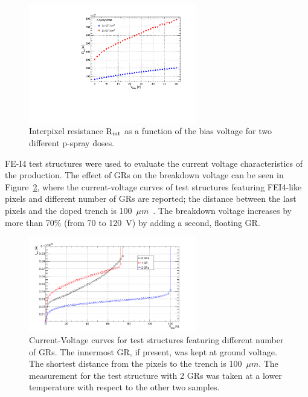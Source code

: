 \begin{figure}[!htbp]
\begin{center}
\includegraphics[width=0.65\textwidth]{edgelessabsCompareRint.pdf}
\caption{\label{fig:Rint}Interpixel resistance $\rm{R_{int}}$ as a function of the bias voltage for two different p-spray doses.}
\end{center}
\end{figure}

 FE-I4 test structures  were used to evaluate the current voltage characteristics  of the production.
The effect of GRs on the breakdown voltage can be seen in Figure~\ref{fig:IV_GRs},
where the current-voltage curves of test structures featuring FEI4-like pixels and different number of GRs are reported;  the distance between the last pixels and the doped trench is 100~$\mu m$~\cite{1748-0221-12-05-P05006}. The breakdown voltage increases by more than 70\% (from 70 to 120~V) by adding a second, floating GR.

\begin{figure}[!htpb]
\centering
\includegraphics[width=0.65\textwidth]{W95_test_structures_ITOT_100um.png}
\caption{\label{fig:IV_GRs}Current-Voltage curves for
 test structures featuring different number of GRs. The
innermost GR, if present, was kept at ground voltage. The  shortest distance from the pixels to the trench is 100~$\mu m$. The measurement for the test structure with 2 GRs was taken at a lower temperature with respect to the other two samples.}
\end{figure}


